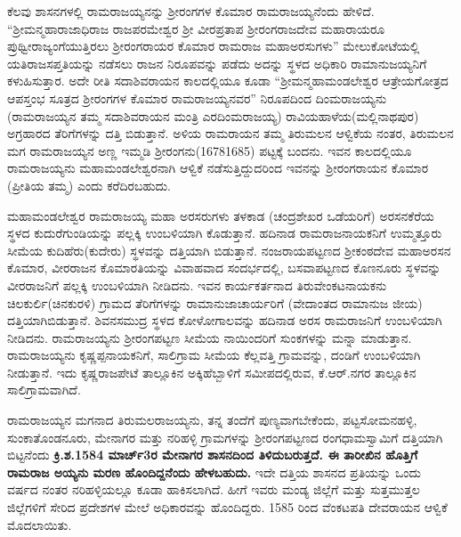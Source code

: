 ಕೆಲವು ಶಾಸನಗಳಲ್ಲಿ ರಾಮರಾಜಯ್ಯನನ್ನು ಶ‍್ರೀರಂಗಗಳ ಕೊಮಾರ ರಾಮರಾಜಯ್ಯನೆಂದು ಹೇಳಿದೆ. “ಶ‍್ರೀಮನ್ಮಹಾ\-ರಾಜಾಧಿರಾಜ ರಾಜಪರಮೇಶ್ವರ ಶ‍್ರೀ ವೀರಪ್ರತಾಪ ಶ‍್ರೀರಂಗರಾಜದೇವ ಮಹಾರಾಯರೂ ಪ್ರುಥ್ವೀರಾಜ್ಯಂಗೆಯುತ್ತಿರಲು ಶ‍್ರೀರಂಗರಾಯರ ಕೊಮಾರ ರಾಮರಾಜ ಮಹಾಅರಸುಗಳು” ಮೇಲುಕೋಟೆಯಲ್ಲಿ ಯತಿರಾಜಸಪ್ತತಿಯನ್ನು ನಡೆಸಲು ರಾಜನ ನಿರೂಪವನ್ನು ಪಡೆದು ಅದನ್ನು ಸ್ಥಳದ ಅಧಿಕಾರಿ ರಾಮಾನುಜಯ್ಯನಿಗೆ ಕಳುಹಿಸುತ್ತಾರ. ಅದೇ ರೀತಿ ಸದಾಶಿವರಾಯನ ಕಾಲದಲ್ಲಿಯೂ ಕೂಡಾ “ಶ‍್ರೀಮನ್ಮಹಾಮಂಡಲೇಶ್ವರ ಆತ್ರೇಯಗೋತ್ರದ ಆಪಸ್ತಂಭ ಸೂತ್ರದ ಶ‍್ರೀರಂಗಗಳ ಕೊಮಾರ ರಾಮರಾಜಯ್ಯನವರ” ನಿರೂಪದಿಂದ ದಿಂಮರಾಜಯ್ಯನು (ರಾಮರಾಜಯ್ಯನ ತಮ್ಮ ಸದಾಶಿವರಾಯನ ಮಂತ್ರಿ ಎರದಿಂಮರಾಜಯ್ಯ) ರಾವಿಯಹಾಳೆಯ(ಮಲ್ಲಿನಾಥಪುರ) ಅಗ್ರಹಾರದ ತೆರಿಗೆಗಳನ್ನು ದತ್ತಿ ಬಿಡುತ್ತಾನೆ. ಅಳಿಯ ರಾಮರಾಯನ ತಮ್ಮ ತಿರುಮಲನ ಆಳ್ವಿಕೆಯ ನಂತರ, ತಿರುಮಲನ ಮಗ ರಾಮರಾಜಯ್ಯನ ಅಣ್ಣ ಇಮ್ಮಡಿ ಶ‍್ರೀರಂಗನು(1678\enginline{-}1685) ಪಟ್ಟಕ್ಕೆ ಬಂದನು. ಇವನ ಕಾಲದಲ್ಲಿಯೂ ರಾಮರಾಜಯ್ಯನು ಮಹಾಮಂಡಲೇಶ್ವರನಾಗಿ ಆಳ್ವಿಕೆ ನಡೆಸುತ್ತಿದ್ದುದರಿಂದ ಇವನನ್ನು ಶ‍್ರೀರಂಗರಾಯನ ಕೊಮಾರ (ಪ್ರೀತಿಯ ತಮ್ಮ) ಎಂದು ಕರೆದಿರಬಹುದು.

\newpage

ಮಹಾಮಂಡಲೇಶ್ವರ ರಾಮರಾಜಯ್ಯ ಮಹಾ ಅರಸರುಗಳು ತಳಕಾಡ (ಚಂದ್ರಶೇಖರ ಒಡೆಯರಿಗೆ) ಅರಸನಕೆರೆಯ ಸ್ಥಳದ ಕುದುರೆಗುಂಡಿಯನ್ನು ಪಲ್ಲಕ್ಕಿ ಉಂಬಳಿಯಾಗಿ ಕೊಡುತ್ತಾನೆ. ಹದಿನಾಡ ರಾಮರಾಜನಾಯಕನಿಗೆ ಉಮ್ಮತ್ತೂರು ಸೀಮೆಯ ಕುದಿಹೆರು(ಕುದೇರು) ಸ್ಥಳವನ್ನು ದತ್ತಿಯಾಗಿ ಬಿಡುತ್ತಾನೆ. ನಂಜರಾಯಪಟ್ಟಣದ ಶ‍್ರೀಕಂಠದೇವ ಮಹಾಅರಸನ ಕೊಮಾರ, ವೀರರಾಜನ ಕೊಮಾರತಿಯನ್ನು ವಿವಾಹವಾದ ಸಂದರ್ಭದಲ್ಲಿ, ಬಸವಾಪಟ್ಟಣದ ಕೊಣನೂರು ಸ್ಥಳವನ್ನು ವೀರರಾಜನಿಗೆ ಪಲ್ಲಕ್ಕಿ ಉಂಬಳಿಯಾಗಿ ನೀಡಿದನು. ಇವನ ಕಾರ್ಯಕರ್ತನಾದ ತಿರುವೇಂಕಟನಾಯಕನು ಚಿಲಕುರ್ಲಿ\break (ಚಿನಕುರಳಿ) ಗ್ರಾಮದ ತೆರಿಗೆಗಳನ್ನು ರಾಮಾನುಜಾಚಾರ್ಯರಿಗೆ (ವೇದಾಂತದ ರಾಮಾನುಜ ಜೀಯ) ದತ್ತಿಯಾಗಿ\break ಬಿಡುತ್ತಾನೆ. ಶಿವನಸಮುದ್ರ ಸ್ಥಳದ ಕೋಳೋಗಾಲವನ್ನು ಹದಿನಾಡ ಅರಸ ರಾಮರಾಜನಿಗೆ ಉಂಬಳಿಯಾಗಿ ನೀಡಿದನು. ರಾಮರಾಜಯ್ಯನು ಶ‍್ರೀರಂಗಪಟ್ಟಣ ಸೀಮೆಯ ನಾಯಿಂದರಿಗೆ ಸುಂಕಗಳನ್ನು ಮನ್ನಾ ಮಾಡುತ್ತಾನ. ರಾಮರಾಜಯ್ಯನು ಕೃಷ್ಣಪ್ಪನಾಯಕನಿಗೆ, ಸಾಲಿಗ್ರಾಮ ಸೀಮೆಯ ಕೆಲ್ಲವತ್ತಿ ಗ್ರಾಮವನ್ನು, ದಂಡಿಗೆ ಉಂಬಳಿಯಾಗಿ ನೀಡುತ್ತಾನೆ. ಇದು ಕೃಷ್ಣರಾಜಪೇಟೆ ತಾಲ್ಲೂಕಿನ ಅಕ್ಕಿಹೆಬ್ಬಾಳಿಗೆ ಸಮೀಪದಲ್ಲಿರುವ, ಕೆ.ಆರ್​.ನಗರ ತಾಲ್ಲೂಕಿನ ಸಾಲಿಗ್ರಾಮವಾಗಿದೆ.

ರಾಮರಾಜಯ್ಯನ ಮಗನಾದ ತಿರುಮಲರಾಜಯ್ಯನು, ತನ್ನ ತಂದೆಗೆ ಪುಣ್ಯವಾಗಬೇಕೆಂದು, ಪಟ್ಟಸೋಮನಹಳ್ಳಿ, ಸುಂಕಾತೊಂಡನೂರು, ಮೇನಾಗರ ಮತ್ತು ನರಿಹಳ್ಳಿ ಗ್ರಾಮಗಳನ್ನು ಶ‍್ರೀರಂಗಪಟ್ಟಣದ ರಂಗಧಾಮಸ್ವಾಮಿಗೆ ದತ್ತಿಯಾಗಿ ಬಿಟ್ಟನೆಂದು \textbf{ಕ್ರಿ.ಶ.1584 ಮಾರ್ಚ್3ರ ಮೇನಾಗರ ಶಾಸನದಿಂದ ತಿಳಿದುಬರುತ್ತದೆ. ಈ ತಾರೀಖಿನ ಹೊತ್ತಿಗೆ ರಾಮರಾಜ ಅಯ್ಯನು ಮರಣ ಹೊಂದಿದ್ದನೆಂದು ಹೇಳಬಹುದು.} ಇದೇ ದತ್ತಿಯ ಶಾಸನದ ಪ್ರತಿಯನ್ನು ಒಂದು ವರ್ಷದ ನಂತರ ನರಿಹಳ್ಳಿಯಲ್ಲೂ ಕೂಡಾ ಹಾಕಿಸಲಾಗಿದೆ. ಹೀಗೆ ಇವರು ಮಂಡ್ಯ ಜಿಲ್ಲೆಗೆ ಮತ್ತು ಸುತ್ತಮುತ್ತಲ ಜಿಲ್ಲೆಗಳಿಗೆ ಸೇರಿದ ಪ್ರದೇಶಗಳ ಮೇಲೆ ಅಧಿಕಾರವನ್ನು ಹೊಂದಿದ್ದರು. 1585 ರಿಂದ ವೆಂಕಟಪತಿ ದೇವರಾಯನ ಆಳ್ವಿಕೆ ಮೊದಲಾಯಿತು.

